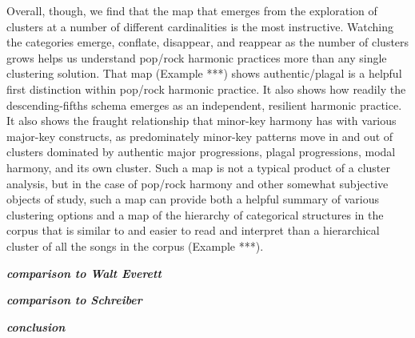 Overall, though, we find that the map that emerges from the exploration of clusters at a number of different cardinalities is the most instructive. Watching the categories emerge, conflate, disappear, and reappear as the number of clusters grows helps us understand pop\slash rock harmonic practices more than any single clustering solution. That map (Example ***) shows authentic\slash plagal is a helpful first distinction within pop\slash rock harmonic practice. It also shows how readily the descending-fifths schema emerges as an independent, resilient harmonic practice. It also shows the fraught relationship that minor-key harmony has with various major-key constructs, as predominately minor-key patterns move in and out of clusters dominated by authentic major progressions, plagal progressions, modal harmony, and its own cluster. Such a map is not a typical product of a cluster analysis, but in the case of pop\slash rock harmony and other somewhat subjective objects of study, such a map can provide both a helpful summary of various clustering options and a map of the hierarchy of categorical structures in the corpus that is similar to and easier to read and interpret than a hierarchical cluster of all the songs in the corpus (Example ***).

\textbf{\emph{comparison to Walt Everett}}

\textbf{\emph{comparison to Schreiber}}

\textbf{\emph{conclusion}}




